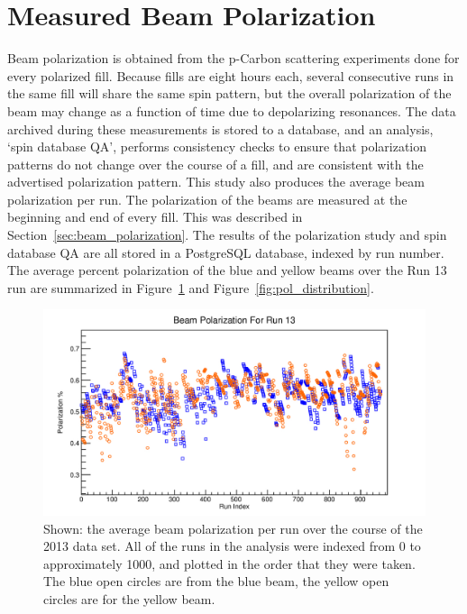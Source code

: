 \section{Measured Beam Polarization}
\label{sec:measured_beam_polarization}

Beam polarization is obtained from the p-Carbon scattering experiments done for
every polarized fill. Because fills are eight hours each, several consecutive
runs in the same fill will share the same spin pattern, but the overall
polarization of the beam may change as a function of time due to depolarizing
resonances. The data archived during these measurements is stored to a database,
and an analysis, `spin database QA', performs consistency checks to ensure that
polarization patterns do not change over the course of a fill, and are
consistent with the advertised polarization pattern. This study also produces
the average beam polarization per run. The polarization of the beams are
measured at the beginning and end of every fill. This was described in
Section~\ref{sec:beam_polarization}. The results of the polarization study and
spin database QA are all stored in a PostgreSQL database, indexed by run number.
The average percent polarization of the blue and yellow beams over the Run 13
run are summarized in Figure~\ref{fig:avg_polarization} and
Figure~\ref{fig:pol_distribution}.

\begin{figure}[ht]
  \centering
  \includegraphics[width=\linewidth]{./figures/beam_polarization.jpg}
  \caption{
    Shown: the average beam polarization per run over the course of the 2013
    data set. All of the runs in the analysis were indexed from 0 to
    approximately 1000, and plotted in the order that they were taken. The blue
    open circles are from the blue beam, the yellow open circles are for the
    yellow beam.
  }
  \label{fig:avg_polarization}
\end{figure}

